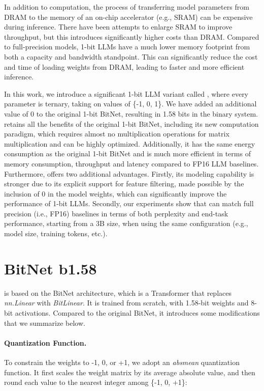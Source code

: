 In addition to computation, the process of transferring model parameters from DRAM to the memory of an on-chip accelerator (e.g., SRAM) can be expensive during inference. There have been attempts to enlarge SRAM to improve throughput, but this introduces significantly higher costs than DRAM. Compared to full-precision models, 1-bit LLMs have a much lower memory footprint from both a capacity and bandwidth standpoint. This can significantly reduce the cost and time of loading weights from DRAM, leading to faster and more efficient inference.

In this work, we introduce a significant 1-bit LLM variant called \textbf{}, where every parameter is ternary, taking on values of \{-1, 0, 1\}. We have added an additional value of 0 to the original 1-bit BitNet, resulting in 1.58 bits in the binary system.  retains all the benefits of the original 1-bit BitNet, including its new computation paradigm, which requires almost no multiplication operations for matrix multiplication and can be highly optimized. Additionally, it has the same energy consumption as the original 1-bit BitNet and is much more efficient in terms of memory consumption, throughput and latency compared to FP16 LLM baselines. Furthermore,  offers two additional advantages. Firstly, its modeling capability is stronger due to its explicit support for feature filtering, made possible by the inclusion of 0 in the model weights, which can significantly improve the performance of 1-bit LLMs. Secondly, our experiments show that  can match full precision (i.e., FP16) baselines in terms of both perplexity and end-task performance, starting from a 3B size, when using the same configuration (e.g., model size, training tokens, etc.).

\section{BitNet b1.58}

 is based on the BitNet architecture, which is a Transformer that replaces \emph{nn.Linear} with \emph{BitLinear}. It is trained from scratch, with 1.58-bit weights and 8-bit activations. Compared to the original BitNet, it introduces some modifications that we summarize below.

\paragraph{Quantization Function.} To constrain the weights to -1, 0, or +1, we adopt an \emph{absmean} quantization function. It first scales the weight matrix by its average absolute value, and then round each value to the nearest integer among \{-1, 0, +1\}:

